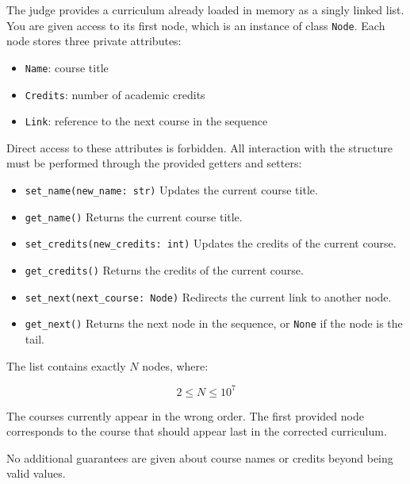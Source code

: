 \documentclass[11pt,a4paper]{article}
\begin{document}
The judge provides a curriculum already loaded in memory as a singly linked list.  
You are given access to its first node, which is an instance of class \texttt{Node}.  
Each node stores three private attributes:

\begin{itemize}
    \item \texttt{Name}: course title
    \item \texttt{Credits}: number of academic credits
    \item \texttt{Link}: reference to the next course in the sequence
\end{itemize}

Direct access to these attributes is forbidden. All interaction with the structure must be performed through the provided getters and setters:

\begin{itemize}
  \item \lstinline[style=pythonstyle]|set_name(new_name: str)|  
  Updates the current course title.

  \item \lstinline[style=pythonstyle]|get_name()|  
  Returns the current course title.

  \item \lstinline[style=pythonstyle]|set_credits(new_credits: int)|  
  Updates the credits of the current course.

  \item \lstinline[style=pythonstyle]|get_credits()|  
  Returns the credits of the current course.

  \item \lstinline[style=pythonstyle]|set_next(next_course: Node)|  
  Redirects the current link to another node.

  \item \lstinline[style=pythonstyle]|get_next()|  
  Returns the next node in the sequence, or \texttt{None} if the node is the tail.
\end{itemize}

The list contains exactly \(N\) nodes, where:

\[
2 \leq N \leq 10^7
\]

The courses currently appear in the wrong order.  
The first provided node corresponds to the course that should appear last in the corrected curriculum.

No additional guarantees are given about course names or credits beyond being valid values.
\end{document}
